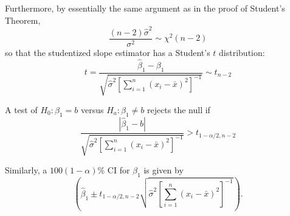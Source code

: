 \documentclass[
]{book}
\begin{document}
Furthermore, by essentially the same argument as in the proof of Student's Theorem,
\[\frac{(n-2)\hat\sigma^2}{\sigma^2}\sim \chi^2(n-2)\]
so that the studentized slope estimator has a Student's \(t\) distribution:
\[t = \frac{\hat\beta_1 - \beta_1}{\sqrt{\hat\sigma^2 \left[\sum_{i=1}^n (x_i - \bar x)^2\right]^{-1}}}\sim t_{n-2}\]

A test of \(H_0:\beta_1 = b\) versus \(H_a:\beta_1 \ne b\) rejects the null if
\[\frac{|\hat\beta_1 - b|}{\sqrt{\hat\sigma^2 \left[\sum_{i=1}^n (x_i - \bar x)^2\right]^{-1}}} > t_{1-\alpha/2, n-2}\]

Similarly, a \(100(1-\alpha)\%\) CI for \(\beta_1\) is given by
\[\left(\hat\beta_1 \pm t_{1-\alpha/2, n-2}\sqrt{\hat\sigma^2 \left[\sum_{i=1}^n (x_i - \bar x)^2\right]^{-1}}\right).\]

  
\end{document}
